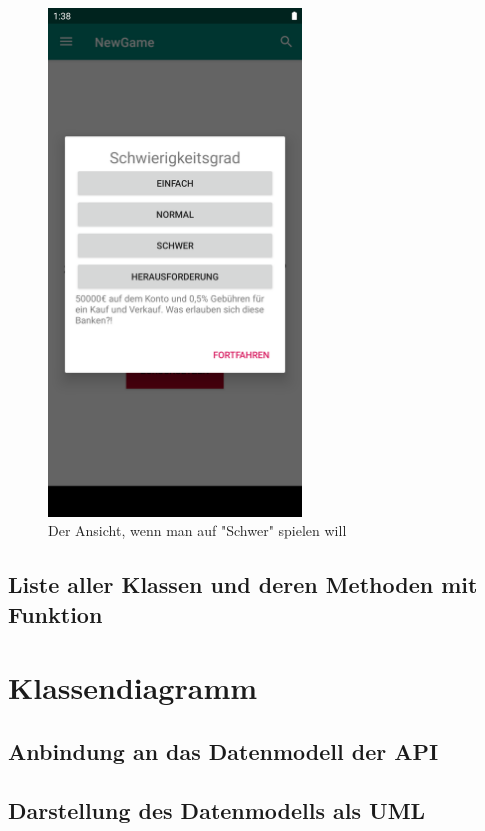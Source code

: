 \documentclass[10pt]{scrartcl}
\begin{document}
\begin{figure}[H]
	\centering
	\includegraphics[width=0.6\textwidth]{Bilder/Applikation/schwierigkeitsgrad.png}
	\caption{Der Ansicht, wenn man auf "Schwer" spielen will}
\end{figure}

\subsection{Liste aller Klassen und deren Methoden mit Funktion}

\section{Klassendiagramm}

\subsection{Anbindung an das Datenmodell der API}

\subsection{Darstellung des Datenmodells als UML}
\end{document}
